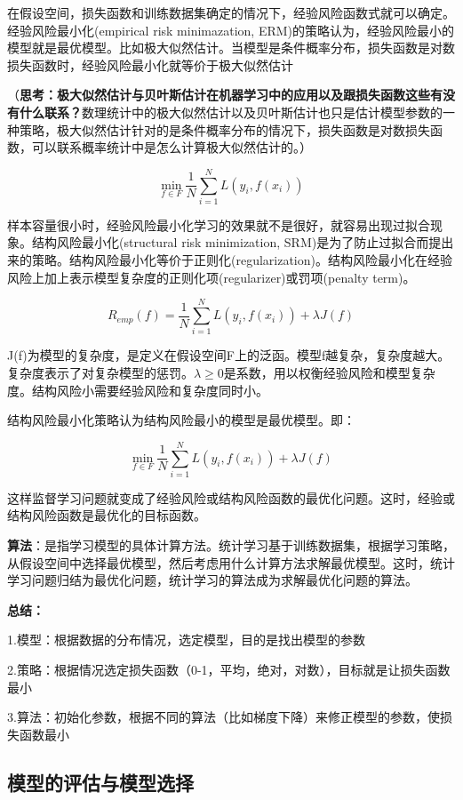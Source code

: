 \documentclass{ctexart}
\begin{document}
	在假设空间，损失函数和训练数据集确定的情况下，经验风险函数式就可以确定。经验风险最小化(empirical risk minimazation, ERM)的策略认为，经验风险最小的模型就是最优模型。比如极大似然估计。{\color{red}当模型是条件概率分布，损失函数是对数损失函数时，经验风险最小化就等价于极大似然估计}
	
	（\textbf{思考：极大似然估计与贝叶斯估计在机器学习中的应用以及跟损失函数这些有没有什么联系？}数理统计中的极大似然估计以及贝叶斯估计也只是估计模型参数的一种策略，极大似然估计针对的是条件概率分布的情况下，损失函数是对数损失函数，可以联系概率统计中是怎么计算极大似然估计的。）
	
	\[\min_{f \in F} \frac{1}{N} \sum_{i=1}^{N}L(y_i, f(x_i))\]
	
	样本容量很小时，经验风险最小化学习的效果就不是很好，就容易出现过拟合现象。结构风险最小化(structural risk minimization, SRM)是为了防止过拟合而提出来的策略。结构风险最小化等价于正则化(regularization)。结构风险最小化在经验风险上加上表示模型复杂度的正则化项(regularizer)或罚项(penalty term)。
	
	\[R_{emp}(f) = \frac{1}{N}\sum_{i=1}^{N}L(y_i, f(x_i)) + \lambda J(f)\]
	
	J(f)为模型的复杂度，是定义在假设空间F上的泛函。模型f越复杂，复杂度越大。复杂度表示了对复杂模型的惩罚。\(\lambda \geq 0\)是系数，用以权衡经验风险和模型复杂度。结构风险小需要经验风险和复杂度同时小。
	
	结构风险最小化策略认为结构风险最小的模型是最优模型。即：
	
	\[\min_{f \in F}  \frac{1}{N} \sum_{i=1}^{N}L(y_i, f(x_i)) + \lambda J(f)\]
	
	这样监督学习问题就变成了经验风险或结构风险函数的最优化问题。这时，经验或结构风险函数是最优化的目标函数。
	
	\mbox{}
	
	\textbf{算法}：是指学习模型的具体计算方法。统计学习基于训练数据集，根据学习策略，从假设空间中选择最优模型，然后考虑用什么计算方法求解最优模型。这时，统计学习问题归结为最优化问题，统计学习的算法成为求解最优化问题的算法。
	
	\mbox{}
	
	\textbf{总结：}
	
	1.模型：根据数据的分布情况，选定模型，目的是找出模型的参数
	
	2.策略：根据情况选定损失函数（0-1，平均，绝对，对数），目标就是让损失函数最小
	
	3.算法：初始化参数，根据不同的算法（比如梯度下降）来修正模型的参数，使损失函数最小

	\subsection{模型的评估与模型选择}
	
\end{document}
